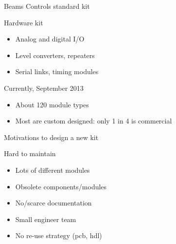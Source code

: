 \documentclass[compress,red]{beamer}
\begin{document}
\begin{frame}{Beams Controls standard kit}

  \begin{block}{Hardware kit}
    \begin{itemize}
    \item
      Analog and digital I/O
    \item
      Level converters, repeaters
    \item
      Serial links, timing modules
    \end{itemize}
  \end{block}

  \begin{block}{Currently, September 2013}
    \begin{itemize}
    \item
      About 120 module types %
    \item
      Most are custom designed: only 1 in 4 is commercial
    \end{itemize}
  \end{block}

\end{frame}

\begin{frame}{Motivations to design a new kit}


  \begin{block}{Hard to maintain}
    \begin{itemize}
    \item
      Lots of different modules
    \item
      Obsolete components/modules
    \item
      No/scarce documentation
    \item
      Small engineer team
    \item
      No re-use strategy (pcb, hdl)
    \end{itemize}
  \end{block}

\end{frame}
\end{document}
